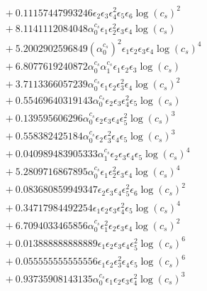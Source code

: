 \documentclass[10pt]{article}
\begin{document}
\begin{align*}
&{}  + 0.11157447993246 \epsilon_{2} \epsilon_{3} \epsilon_{4}^{2} \epsilon_{5} \epsilon_{6} \log{\left(c_{s} \right)}^{2} \\
&{}  + 8.1141112084048 \alpha_{0}^{c_s} \epsilon_{1} \epsilon_{2}^{2} \epsilon_{3} \epsilon_{4} \log{\left(c_{s} \right)} \\
&{}  + 5.2002902596849 \left(\alpha_{0}^{c_s}\right)^{2} \epsilon_{1} \epsilon_{2} \epsilon_{3} \epsilon_{4} \log{\left(c_{s} \right)}^{4} \\
&{}  + 6.8077619240872 \alpha_{0}^{c_s} \alpha_{1}^{c_s} \epsilon_{1} \epsilon_{2} \epsilon_{3} \log{\left(c_{s} \right)} \\
&{}  + 3.7113366057239 \alpha_{0}^{c_s} \epsilon_{1} \epsilon_{2} \epsilon_{3}^{2} \epsilon_{4} \log{\left(c_{s} \right)}^{2} \\
&{}  + 0.55469640319143 \alpha_{0}^{c_s} \epsilon_{2} \epsilon_{3} \epsilon_{4}^{2} \epsilon_{5} \log{\left(c_{s} \right)} \\
&{}  + 0.139595606296 \alpha_{0}^{c_s} \epsilon_{2} \epsilon_{3} \epsilon_{4} \epsilon_{5}^{2} \log{\left(c_{s} \right)}^{3} \\
&{}  + 0.558382425184 \alpha_{0}^{c_s} \epsilon_{2} \epsilon_{3}^{2} \epsilon_{4} \epsilon_{5} \log{\left(c_{s} \right)}^{3} \\
&{}  + 0.040989483905333 \alpha_{1}^{c_s} \epsilon_{2} \epsilon_{3} \epsilon_{4} \epsilon_{5} \log{\left(c_{s} \right)}^{4} \\
&{}  + 5.2809716867895 \alpha_{0}^{c_s} \epsilon_{1} \epsilon_{2}^{2} \epsilon_{3} \epsilon_{4} \log{\left(c_{s} \right)}^{4} \\
&{}  + 0.083680859949347 \epsilon_{2} \epsilon_{3} \epsilon_{4} \epsilon_{5}^{2} \epsilon_{6} \log{\left(c_{s} \right)}^{2} \\
&{}  + 0.34717984492254 \epsilon_{1} \epsilon_{2} \epsilon_{3} \epsilon_{4}^{2} \epsilon_{5} \log{\left(c_{s} \right)}^{4} \\
&{}  + 6.7094033465856 \alpha_{0}^{c_s} \epsilon_{1}^{2} \epsilon_{2} \epsilon_{3} \epsilon_{4} \log{\left(c_{s} \right)}^{2} \\
&{}  + 0.013888888888889 \epsilon_{1} \epsilon_{2} \epsilon_{3} \epsilon_{4} \epsilon_{5}^{2} \log{\left(c_{s} \right)}^{6} \\
&{}  + 0.055555555555556 \epsilon_{1} \epsilon_{2} \epsilon_{3}^{2} \epsilon_{4} \epsilon_{5} \log{\left(c_{s} \right)}^{6} \\
&{}  + 0.93735908143135 \alpha_{0}^{c_s} \epsilon_{1} \epsilon_{2} \epsilon_{3} \epsilon_{4}^{2} \log{\left(c_{s} \right)}^{3} \\

\end{align*}
\end{document}
